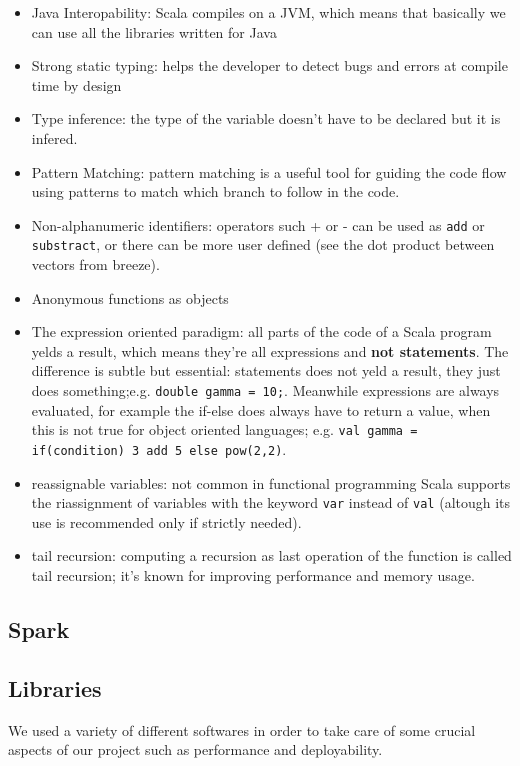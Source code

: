 \documentclass{sig-alternate-05-2015}
\begin{document}
\begin{itemize}
    \item Java Interopability: Scala compiles on a JVM, which means that basically we
    can use all the libraries written for Java
    \item Strong static typing: helps the developer to detect bugs and errors at compile time by design
    \item Type inference: the type of the variable doesn't have to be declared but it is infered.
    \item Pattern Matching: pattern matching is a useful tool for guiding the code flow using
    patterns to match which branch to follow in the code.
    \item Non-alphanumeric identifiers: operators such + or - can be used as \texttt{add} or \texttt{substract}, or
    there can be more user defined (see the dot product between vectors from breeze).
    \item Anonymous functions as objects
    \item The expression oriented paradigm: all parts of the code of a Scala program yelds a result, which means they're all
    expressions and \textbf{not statements}. The difference is subtle but essential: statements does not yeld a result, they
    just does something;e.g. \texttt{double gamma = 10;}. Meanwhile expressions are always evaluated, for example the if-else does
    always have to return a value, when this is not true for object oriented languages; e.g. \texttt{val gamma = if(condition) 3 add 5 else pow(2,2)}.
    \item reassignable variables: not common in functional programming Scala supports the riassignment of variables with the
    keyword \texttt{var} instead of \texttt{val} (altough its use is recommended only if strictly needed).
    \item tail recursion: computing a recursion as last operation of the function is called tail recursion; it's known for improving
    performance and memory usage.
\end{itemize}
\subsection{Spark}

\subsection{Libraries}
We used a variety of different softwares in order
to take care of some crucial aspects of our project such
as performance and deployability.
\end{document}
